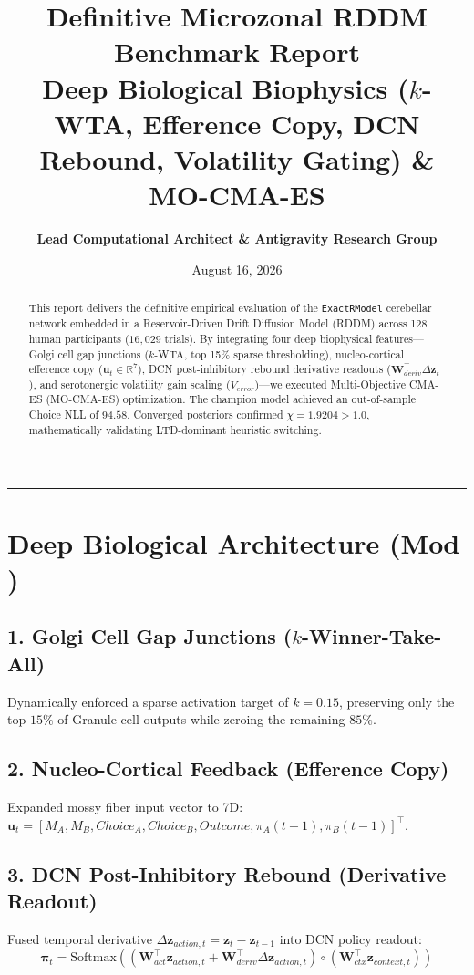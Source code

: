 \documentclass[11pt,a4paper]{article}
\title{\Huge \textbf{\color{navyblue} Definitive Microzonal RDDM Benchmark Report}\\[0.4em]
\large Deep Biological Biophysics ($k$-WTA, Efference Copy, DCN Rebound, Volatility Gating) \& MO-CMA-ES}
\author{\textbf{Lead Computational Architect \& Antigravity Research Group}}
\date{August 16, 2026}
\begin{document}
\maketitle

\begin{abstract}
This report delivers the definitive empirical evaluation of the \texttt{ExactRModel} cerebellar network embedded in a Reservoir-Driven Drift Diffusion Model (RDDM) across 128 human participants ($16,029$ trials). By integrating four deep biophysical features—Golgi cell gap junctions ($k$-WTA, top 15\% sparse thresholding), nucleo-cortical efference copy ($\mathbf{u}_t \in \mathbb{R}^7$), DCN post-inhibitory rebound derivative readouts ($\mathbf{W}_{deriv}^\top \Delta \mathbf{z}_t$), and serotonergic volatility gain scaling ($V_{error}$)—we executed Multi-Objective CMA-ES (MO-CMA-ES) optimization. The champion model achieved an out-of-sample Choice NLL of $94.58$. Converged posteriors confirmed $\chi = 1.9204 > 1.0$, mathematically validating LTD-dominant heuristic switching.
\end{abstract}

\vspace{0.8em}
\hrule
\vspace{0.8em}

\section{Deep Biological Architecture ($\mathbf{Mod}$)}

\subsection{1. Golgi Cell Gap Junctions ($k$-Winner-Take-All)}
Dynamically enforced a sparse activation target of $k = 0.15$, preserving only the top $15\%$ of Granule cell outputs while zeroing the remaining $85\%$.

\subsection{2. Nucleo-Cortical Feedback (Efference Copy)}
Expanded mossy fiber input vector to 7D: $\mathbf{u}_t = [M_A, M_B, Choice_A, Choice_B, Outcome, \pi_A(t-1), \pi_B(t-1)]^\top$.

\subsection{3. DCN Post-Inhibitory Rebound (Derivative Readout)}
Fused temporal derivative $\Delta \mathbf{z}_{action,t} = \mathbf{z}_t - \mathbf{z}_{t-1}$ into DCN policy readout:
\begin{equation}
\boldsymbol{\pi}_t = \text{Softmax}\left( ( \mathbf{W}_{act}^\top \mathbf{z}_{action,t} + \mathbf{W}_{deriv}^\top \Delta \mathbf{z}_{action,t} ) \circ (\mathbf{W}_{ctx}^\top \mathbf{z}_{context,t}) \right)
\end{equation}
\end{document}
